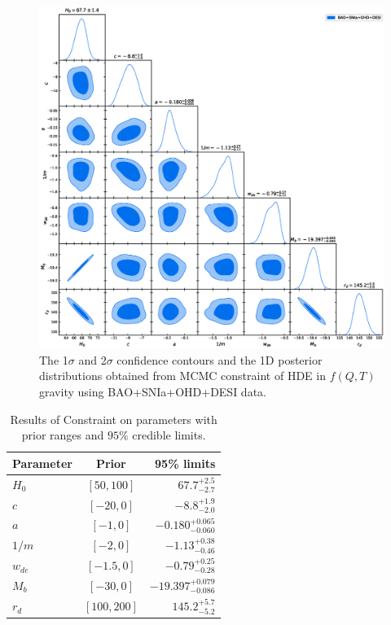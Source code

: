 \documentclass[a4paper,fleqn]{cas-sc}
\begin{document}
\begin{figure}
    \centering
    \includegraphics[width=1\linewidth]{./pic/getdist.eps}
    \caption{\label{Fig:constraint} The 1$\sigma$ and 2$\sigma$ confidence contours and the 1D posterior distributions obtained from MCMC constraint of HDE in $f(Q,T)$ gravity using BAO+SNIa+OHD+DESI data.}
\end{figure}


\begin{table}
    \centering
    \caption{Results of Constraint on parameters with prior ranges and $95\%$ credible limits.}
    \begin{tabular} { l  c  r}
        \toprule
        Parameter & Prior & 95\% limits\\
        \midrule
        {\boldmath$H_0            $} & $[50, 100]$ & $67.7^{+2.5}_{-2.7}$ \\
        
        {\boldmath$c              $} & $[-20, 0]$ & $-8.8^{+1.9}_{-2.0}$ \\
        
        {\boldmath$a              $} & $[-1, 0]$ & $-0.180^{+0.065}_{-0.060}$ \\
        
        {\boldmath$1/m            $} & $[-2, 0]$ & $-1.13^{+0.38}_{-0.46}$ \\
        
        {\boldmath$w_{de}         $} & $[-1.5, 0]$ & $-0.79^{+0.25}_{-0.28}$ \\
        
        {\boldmath$M_b            $} & $[-30, 0]$ & $-19.397^{+0.079}_{-0.086}$ \\
        
        {\boldmath$r_d            $} & $[100, 200]$ & $145.2^{+5.7}_{-5.2}$ \\
        \bottomrule
    \end{tabular}

    \label{tab:results}
\end{table}
\end{document}
